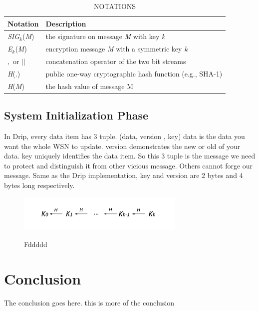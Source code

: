 \documentclass[10pt, conference, compsocconf]{IEEEtran}
\begin{document}
\begin{table}[!htp]
\begin{tabular}{l l}

\hline
Notation & Description  \\
\hline
\emph{SIG}$_k$(\emph{M}) & the signature on message \emph{M} with key \emph{k} \\
\emph{E}$_k$(\emph{M}) & encryption message \emph{M} with a symmetric key \emph{k}\\

$,$ or $||$ & concatenation operator of the two bit streams\\

\emph{H}(.) & public one-way cryptographic hash function (e.g., SHA-1)\\

\emph{H}(\emph{M}) & the hash value of message M\\
\end{tabular}

\caption{NOTATIONS}
\end{table}
\subsection{System Initialization Phase}

In Drip, every data item has 3 tuple. (data, version , key) data is the data you want the whole WSN to update. version demonstrates the new or old of your data. key uniquely identifies the data item. So this 3 tuple is the message we need to protect and distinguish it from other vicious message. Others cannot forge our message.  Same as the Drip implementation, key and version are 2 bytes and 4 bytes long respectively. 

\begin{figure}
\centering
\includegraphics[width=8cm]{Hash_chain.pdf}\\
\caption{Fddddd}\label{11} 
\end{figure}



\section{Conclusion}
The conclusion goes here. this is more of the conclusion
\end{document}
